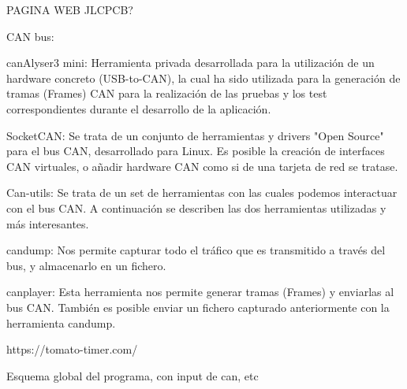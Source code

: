 PAGINA WEB JLCPCB?

CAN bus:

canAlyser3 mini: Herramienta privada desarrollada para la utilización de un hardware concreto (USB-to-CAN), la cual ha sido utilizada para la generación de tramas (Frames) CAN para la realización de las pruebas y los test correspondientes durante el desarrollo de la aplicación.

SocketCAN: Se trata de un conjunto de herramientas y drivers "Open Source" para el bus CAN, desarrollado para Linux. Es posible la creación de interfaces CAN virtuales, o añadir hardware CAN como si de una tarjeta de red se tratase.

Can-utils: Se trata de un set de herramientas con las cuales podemos interactuar con el bus CAN. A continuación se describen las dos herramientas utilizadas y más interesantes.

candump: Nos permite capturar todo el tráfico que es transmitido a través del bus, y almacenarlo en un fichero.

canplayer: Esta herramienta nos permite generar tramas (Frames) y enviarlas al bus CAN. También es posible enviar un fichero capturado anteriormente con la herramienta candump.


https://tomato-timer.com/



Esquema global del programa, con input de can, etc


